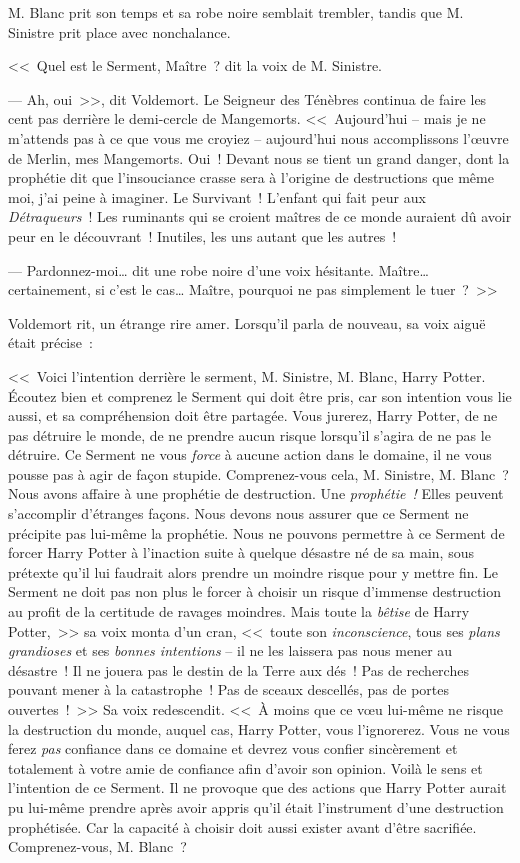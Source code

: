 M. Blanc prit son temps et sa robe noire semblait trembler, tandis que M. Sinistre prit place avec nonchalance.

<<~Quel est le Serment, Maître~? dit la voix de M. Sinistre.

--- Ah, oui~>>, dit Voldemort. Le Seigneur des Ténèbres continua de faire les cent pas derrière le demi-cercle de Mangemorts. <<~Aujourd'hui -- mais je ne m'attends pas à ce que vous me croyiez -- aujourd'hui nous accomplissons l'œuvre de Merlin, mes Mangemorts. Oui~! Devant nous se tient un grand danger, dont la prophétie dit que l'insouciance crasse sera à l'origine de destructions que même moi, j'ai peine à imaginer. Le Survivant~! L'enfant qui fait peur aux \emph{Détraqueurs}~! Les ruminants qui se croient maîtres de ce monde auraient dû avoir peur en le découvrant~! Inutiles, les uns autant que les autres~!

--- Pardonnez-moi… dit une robe noire d'une voix hésitante. Maître… certainement, si c'est le cas… Maître, pourquoi ne pas simplement le tuer~?~>>

Voldemort rit, un étrange rire amer. Lorsqu'il parla de nouveau, sa voix aiguë était précise~:

<<~Voici l'intention derrière le serment, M. Sinistre, M. Blanc, Harry Potter. Écoutez bien et comprenez le Serment qui doit être pris, car son intention vous lie aussi, et sa compréhension doit être partagée. Vous jurerez, Harry Potter, de ne pas détruire le monde, de ne prendre aucun risque lorsqu'il s'agira de ne pas le détruire. Ce Serment ne vous \emph{force} à aucune action dans le domaine, il ne vous pousse pas à agir de façon stupide. Comprenez-vous cela, M. Sinistre, M. Blanc~? Nous avons affaire à une prophétie de destruction. Une \emph{prophétie~!} Elles peuvent s'accomplir d'étranges façons. Nous devons nous assurer que ce Serment ne précipite pas lui-même la prophétie. Nous ne pouvons permettre à ce Serment de forcer Harry Potter à l'inaction suite à quelque désastre né de sa main, sous prétexte qu'il lui faudrait alors prendre un moindre risque pour y mettre fin. Le Serment ne doit pas non plus le forcer à choisir un risque d'immense destruction au profit de la certitude de ravages moindres. Mais toute la \emph{bêtise} de Harry Potter,~>> sa voix monta d'un cran, <<~toute son \emph{inconscience}, tous ses \emph{plans grandioses} et ses \emph{bonnes intentions} -- il ne les laissera pas nous mener au désastre~! Il ne jouera pas le destin de la Terre aux dés~! Pas de recherches pouvant mener à la catastrophe~! Pas de sceaux descellés, pas de portes ouvertes~!~>> Sa voix redescendit. <<~À moins que ce vœu lui-même ne risque la destruction du monde, auquel cas, Harry Potter, vous l'ignorerez. Vous ne vous ferez \emph{pas} confiance dans ce domaine et devrez vous confier sincèrement et totalement à votre amie de confiance afin d'avoir son opinion. Voilà le sens et l'intention de ce Serment. Il ne provoque que des actions que Harry Potter aurait pu lui-même prendre après avoir appris qu'il était l'instrument d'une destruction prophétisée. Car la capacité à choisir doit aussi exister avant d'être sacrifiée. Comprenez-vous, M. Blanc~?

